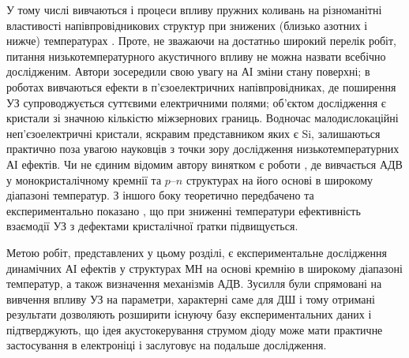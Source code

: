 У тому числі вивчаються і процеси впливу пружних коливань на різноманітні властивості напівпровідникових структур при знижених
(близько азотних і нижче) температурах
\cite{Savkina:FM2003,Savkina:SPQEO2013,Savkina:PJTF2015,Savkina:PSSc2015,Savkina2015,Savkina:JPD2010,kryshtab_savkina_smirnov_2013,
Vlasenko2000r,SavkinaPSSB2002,Zhuravlev,BorkovFTT,sheinkman1995,belyaev1994,buyanova1994,Ostapenko1994,KorotchenAPL1998,KOROTCHENKOV1998,
Korotchenkov1995,KorotchFTP1996,YOlikh:UFG2016,YOlikh:SupMicr,YOlikhTPL2011r}.
Проте, не зважаючи на достатньо широкий перелік робіт, питання низькотемпературного акустичного впливу не можна назвати всебічно дослідженим.
Автори \cite{Savkina:FM2003,Savkina:SPQEO2013,Savkina:PJTF2015,Savkina:PSSc2015,Savkina2015,Savkina:JPD2010,kryshtab_savkina_smirnov_2013}
зосередили свою увагу на АІ зміни стану поверхні;
в роботах \cite{Zhuravlev,BorkovFTT,sheinkman1995,belyaev1994,buyanova1994,Ostapenko1994,KorotchenAPL1998,KOROTCHENKOV1998} вивчаються ефекти в п'єзоелектричних
напівпровідниках, де поширення УЗ супроводжується суттєвими електричними полями;
об'єктом дослідження \cite{Vlasenko2000r,SavkinaPSSB2002,YOlikh:UFG2016,YOlikh:SupMicr} є кристали зі значною кількістю міжзернових границь.
Водночас малодислокаційні неп'єзоелектричні кристали, яскравим представником яких є Si, залишаються практично поза увагою
науковців з точки зору дослідження низькотемпературних АІ ефектів.
Чи не єдиним відомим автору винятком є роботи \cite{Korotchenkov1995,KorotchFTP1996,YOlikhTPL2011r},
де вивчається АДВ у монокристалічному кремнії та $p$--$n$ структурах на його основі в широкому діапазоні температур.
З іншого боку теоретично передбачено \cite{Pavlovich} та експериментально показано \cite{YOlikh:UFG2016,YOlikh:SupMicr},
що при зниженні температури ефективність взаємодії УЗ з дефектами кристалічної ґратки підвищується.

Метою робіт, представлених у цьому розділі, є
експериментальне дослідження динамічних АІ ефектів у структурах МН на основі кремнію в широкому діапазоні температур,
а також визначення механізмів АДВ.
Зусилля були спрямовані на вивчення впливу УЗ на параметри, характерні саме для ДШ і тому отримані результати дозволяють розширити
існуючу базу експериментальних даних і підтверджують, що
ідея акустокерування струмом діоду може мати практичне застосування в електроніці і заслуговує на подальше дослідження.

%
%



